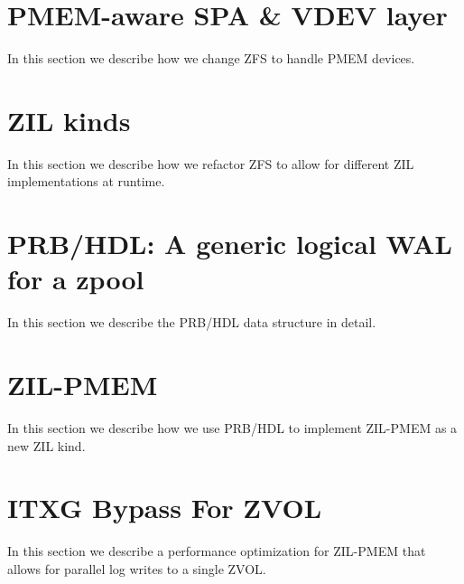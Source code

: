 \documentclass[12pt,a4paper,twoside,draft]{book}
\begin{document}
\section{PMEM-aware SPA \& VDEV layer}
In this section we describe how we change ZFS to handle PMEM devices.

\section{ZIL kinds}
In this section we describe how we refactor ZFS to allow for different ZIL implementations at runtime.

\section{PRB/HDL: A generic logical WAL for a zpool}
In this section we describe the PRB/HDL data structure in detail.


\section{ZIL-PMEM}
In this section we describe how we use PRB/HDL to implement ZIL-PMEM as a new ZIL kind.

\section{ITXG Bypass For ZVOL}
In this section we describe a performance optimization for ZIL-PMEM that allows for parallel log writes to a single ZVOL.
\end{document}
